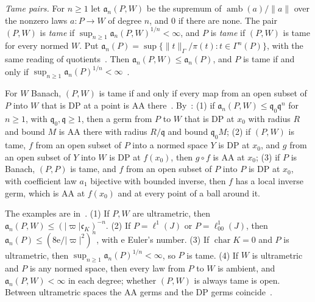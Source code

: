 \documentclass[11pt]{amsart}
\theoremstyle{definition}
\theoremstyle{remark}
\numberwithin{equation}{section}
\newcommand{\abs}[1]{\lvert #1\rvert}
\newcommand{\norm}[1]{\lVert #1\rVert}
\theoremstyle{plain}
\theoremstyle{definition}
\theoremstyle{plain}
\begin{document}
\emph{Tame pairs.} For $n\ge1$ let $\mathfrak a_n(P,W)$ be the supremum of $\operatorname{amb}(a)/\norm a$ over the nonzero laws $a\colon P\to W$ of degree $n$, and $0$ if there are none. The pair $(P,W)$ is \emph{tame} if $\sup_{n\ge1}\mathfrak a_n(P,W)^{1/n}<\infty$, and $P$ is \emph{tame} if $(P,W)$ is tame for every normed $W$. Put $\mathfrak a_n(P)=\sup\{\norm t_\Gamma/\pi(t):t\in\Gamma^n(P)\}$, with the same reading of quotients~\cite[Definition~14.36]{I}. Then $\mathfrak a_n(P,W)\le\mathfrak a_n(P)$, and $P$ is tame if and only if $\sup_{n\ge1}\mathfrak a_n(P)^{1/n}<\infty$~\cite[text after Definition~14.36]{I}.

For $W$ Banach, $(P,W)$ is tame if and only if every map from an open subset of $P$ into $W$ that is DP at a point is AA there~\cite[Proposition~14.37]{I}. By~\cite[Theorem~14.38]{I}: (1) if $\mathfrak a_n(P,W)\le\mathfrak q_0\mathfrak q^n$ for $n\ge1$, with $\mathfrak q_0,\mathfrak q\ge1$, then a germ from $P$ to $W$ that is DP at $x_0$ with radius $R$ and bound $M$ is AA there with radius $R/\mathfrak q$ and bound $\mathfrak q_0M$; (2) if $(P,W)$ is tame, $f$ from an open subset of $P$ into a normed space $Y$ is DP at $x_0$, and $g$ from an open subset of $Y$ into $W$ is DP at $f(x_0)$, then $g\circ f$ is AA at $x_0$; (3) if $P$ is Banach, $(P,P)$ is tame, and $f$ from an open subset of $P$ into $P$ is DP at $x_0$, with coefficient law $a_1$ bijective with bounded inverse, then $f$ has a local inverse germ, which is AA at $f(x_0)$ and at every point of a ball around it.

The examples are in~\cite[Theorem~14.39]{I}. (1) If $P,W$ are ultrametric, then $\mathfrak a_n(P,W)\le(\abs\varpi\mathfrak c_K)^{-n}$. (2) If $P=\ell^1(J)$ or $P=\ell^1_{00}(J)$, then $\mathfrak a_n(P)\le(8\mathrm e/\abs\varpi^2)^n$, with $\mathrm e$ Euler's number. (3) If $\operatorname{char}K=0$ and $P$ is ultrametric, then $\sup_{n\ge1}\mathfrak a_n(P)^{1/n}<\infty$, so $P$ is tame. (4) If $W$ is ultrametric and $P$ is any normed space, then every law from $P$ to $W$ is ambient, and $\mathfrak a_n(P,W)<\infty$ in each degree; whether $(P,W)$ is always tame is open. Between ultrametric spaces the AA germs and the DP germs coincide~\cite[Theorem~14.39(1)]{I}.
\end{document}
